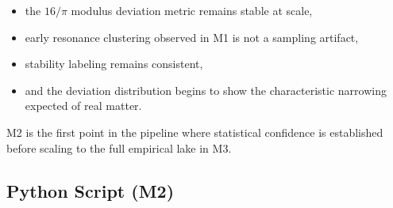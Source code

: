 \documentclass[11pt, letterpaper, openany]{book}
\begin{document}
\begin{itemize}
    \item the $16/\pi$ modulus deviation metric remains stable at scale,
    \item early resonance clustering observed in M1 is not a sampling artifact,
    \item stability labeling remains consistent,
    \item and the deviation distribution begins to show the characteristic
          narrowing expected of real matter.
\end{itemize}

M2 is the first point in the pipeline where statistical confidence is established
before scaling to the full empirical lake in M3.

\subsection*{Python Script (M2)}
\end{document}
